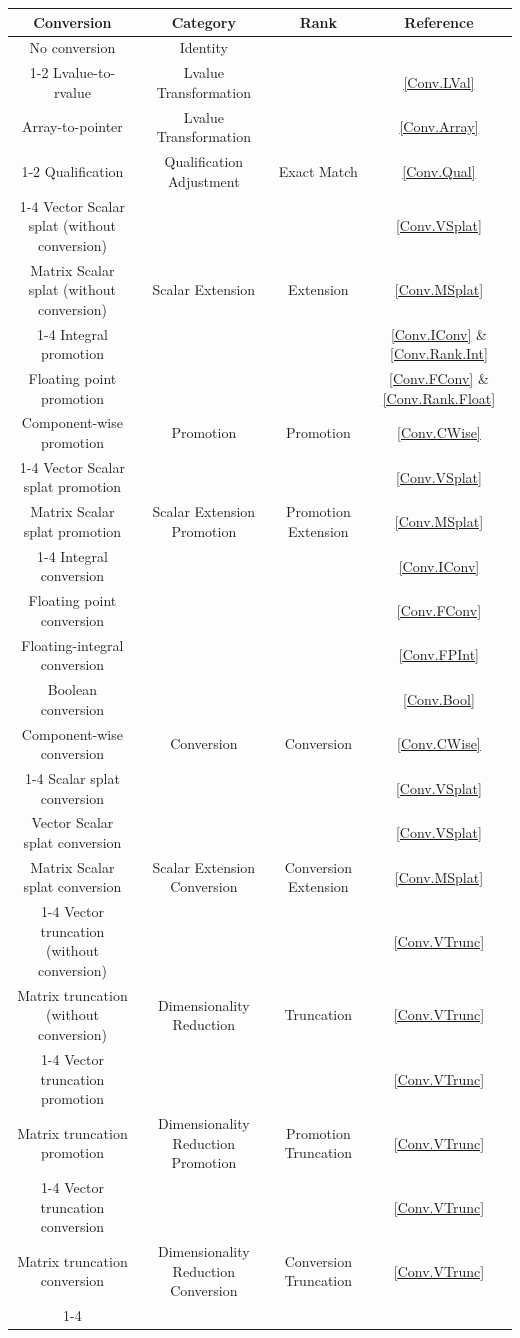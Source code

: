 \begin{center}
  \begin{tabular}{|| c | c | c | c ||}
    \hline
Conversion & Category & Rank & Reference \\
\hline
No conversion  & Identity  &  & \\ \cline{1-2}\cline{4-4}
Lvalue-to-rvalue  & Lvalue Transformation  &  & \ref{Conv.LVal} \\
Array-to-pointer  & Lvalue Transformation  &  & \ref{Conv.Array} \\ \cline{1-2}
Qualification  & Qualification Adjustment  & Exact Match  & \ref{Conv.Qual} \\ \cline{1-4}
Vector Scalar splat (without conversion)  &  &  & \ref{Conv.VSplat} \\
Matrix Scalar splat (without conversion)  & Scalar Extension  & Extension  & \ref{Conv.MSplat} \\ \cline{1-4}
Integral promotion  &  &  & \ref{Conv.IConv} \& \ref{Conv.Rank.Int} \\
Floating point promotion  &  &  & \ref{Conv.FConv} \& \ref{Conv.Rank.Float} \\
Component-wise promotion  & Promotion  & Promotion  & \ref{Conv.CWise} \\ \cline{1-4}
Vector Scalar splat promotion  &   &  & \ref{Conv.VSplat} \\
Matrix Scalar splat promotion  & Scalar Extension Promotion  & Promotion Extension  & \ref{Conv.MSplat} \\ \cline{1-4}
Integral conversion  &  &  & \ref{Conv.IConv} \\
Floating point conversion  &  &  & \ref{Conv.FConv} \\
Floating-integral conversion  &  &  & \ref{Conv.FPInt} \\
Boolean conversion  &  &  & \ref{Conv.Bool} \\
Component-wise conversion  & Conversion  & Conversion  & \ref{Conv.CWise} \\ \cline{1-4}
Scalar splat conversion  &  &  & \ref{Conv.VSplat} \\
Vector Scalar splat conversion  &  & & \ref{Conv.VSplat} \\
Matrix Scalar splat conversion  & Scalar Extension Conversion  & Conversion Extension  & \ref{Conv.MSplat} \\ \cline{1-4}
Vector truncation (without conversion)  &  &  & \ref{Conv.VTrunc} \\
Matrix truncation (without conversion)  & Dimensionality Reduction  & Truncation  & \ref{Conv.VTrunc} \\ \cline{1-4}
Vector truncation promotion  & &  & \ref{Conv.VTrunc} \\
Matrix truncation promotion  & Dimensionality Reduction Promotion  & Promotion Truncation  & \ref{Conv.VTrunc} \\ \cline{1-4}
Vector truncation conversion  & & & \ref{Conv.VTrunc} \\
Matrix truncation conversion  & Dimensionality Reduction Conversion  & Conversion Truncation  & \ref{Conv.VTrunc} \\ \cline{1-4}
\hline
  \end{tabular}
\end{center}

